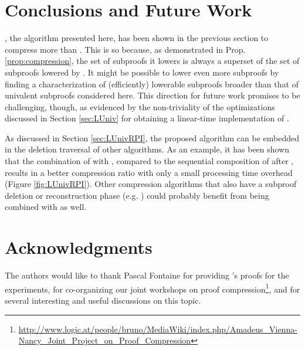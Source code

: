 \documentclass{llncs}
\begin{document}
%

%

\section{Conclusions and Future Work}

{\LowerUnivalents}, the algorithm presented here, has been shown in the previous section to compress
more than {\LowerUnits}. This is so because, as demonstrated in Prop. \ref{prop:compression}, the
set of subproofs it lowers is always a superset of the set of subproofs lowered by {\LowerUnits}. It might
be possible to lower even more subproofs by finding a characterization of (efficiently) lowerable subproofs
broader than that of univalent subproofs considered here. This direction for future work promises to be challenging, though, as evidenced by the non-triviality of the optimizations discussed in Section \ref{sec:LUniv} for obtaining a linear-time implementation of {\LowerUnivalents}.

As discussed in Section \ref{sec:LUnivRPI}, the proposed algorithm can be embedded in the deletion traversal of other algorithms.  As
an example, it has been shown that the combination of {\LowerUnivalents} with {\RPI}, compared to
the sequential composition of {\LowerUnits} after {\RPI}, results in a better compression ratio with
only a small processing time overhead (Figure \ref{fig:LUnivRPI}). Other compression algorithms that also have a subproof
deletion or reconstruction phase (e.g. \ReduceReconstruct) could probably benefit from being
combined with {\LowerUnivalents} as well.



\section*{Acknowledgments}

The authors would like to thank Pascal Fontaine for providing {\veriT}'s proofs for the experiments,
for co-organizing our joint workshops on proof
compression\footnote{\url{http://www.logic.at/people/bruno/MediaWiki/index.php/Amadeus_Vienna-Nancy_Joint_Project_on_Proof_Compression}},
and for several interesting and useful discussions on this topic.




\end{document}
